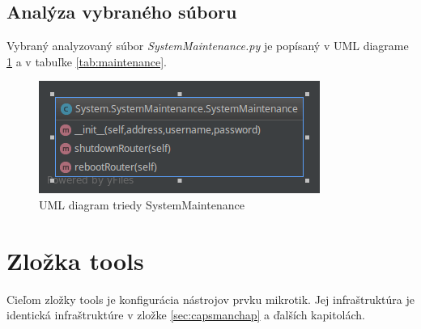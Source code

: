 \subsection{Analýza vybraného súboru}
Vybraný analyzovaný súbor \textit{SystemMaintenance.py} je popísaný v UML diagrame \ref{fig:systemMaintenance} a v tabuľke \ref{tab:maintenance}.
\begin{table}[H]
\centering
{}
\caption{Tabuľka metód triedy SystemMaintenance}
\label{tab:maintenance}
\end{table}
\begin{figure}[H]
\centering
\includegraphics[scale=0.5]{../text/SystemMaintenance.png}
\caption{UML diagram triedy SystemMaintenance}
\label{fig:systemMaintenance}
\end{figure}
\section{Zložka tools}
Cieľom zložky tools je konfigurácia nástrojov prvku mikrotik. Jej infraštruktúra je identická infraštruktúre v zložke \ref{sec:capsmanchap} a ďalších kapitolách.
